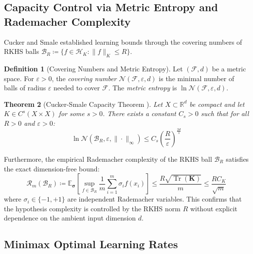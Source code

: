 \documentclass[11pt,a4paper]{article}
\newtheorem{theorem}{Theorem}[section]
\theoremstyle{definition}
\newtheorem{definition}[theorem]{Definition}
\begin{document}
\subsection{Capacity Control via Metric Entropy and Rademacher Complexity}

Cucker and Smale \cite{cucker2002} established learning bounds through the covering numbers of RKHS balls $\mathcal{B}_R \coloneqq \{ f \in \mathcal{H}_K : \|f\|_K \le R \}$.

\begin{definition}[Covering Numbers and Metric Entropy]\label{def:covering_numbers}
Let $(\mathcal{F}, d)$ be a metric space. For $\varepsilon > 0$, the \emph{covering number} $\mathcal{N}(\mathcal{F}, \varepsilon, d)$ is the minimal number of balls of radius $\varepsilon$ needed to cover $\mathcal{F}$. The \emph{metric entropy} is $\ln \mathcal{N}(\mathcal{F}, \varepsilon, d)$.
\end{definition}

\begin{theorem}[Cucker-Smale Capacity Theorem \cite{cucker2002}]\label{thm:cucker_smale_capacity}
Let $X \subset \mathbb{R}^d$ be compact and let $K \in C^s(X \times X)$ for some $s > 0$. There exists a constant $C_s > 0$ such that for all $R > 0$ and $\varepsilon > 0$:
\begin{equation}\label{eq:covering_bound}
\ln \mathcal{N}(\mathcal{B}_R, \varepsilon, \|\cdot\|_\infty) \le C_s \left( \frac{R}{\varepsilon} \right)^{\frac{2d}{s}}
\end{equation}
\end{theorem}

Furthermore, the empirical Rademacher complexity of the RKHS ball $\mathcal{B}_R$ satisfies the exact dimension-free bound:
\begin{equation}\label{eq:rademacher_bound}
\mathcal{R}_m(\mathcal{B}_R) \coloneqq \mathbb{E}_{\boldsymbol{\sigma}} \left[ \sup_{f \in \mathcal{B}_R} \frac{1}{m} \sum_{i=1}^m \sigma_i f(x_i) \right] \le \frac{R \sqrt{\operatorname{Tr}(\mathbf{K})}}{m} \le \frac{R C_K}{\sqrt{m}}
\end{equation}
where $\sigma_i \in \{-1, +1\}$ are independent Rademacher variables. This confirms that the hypothesis complexity is controlled by the RKHS norm $R$ without explicit dependence on the ambient input dimension $d$.

\subsection{Minimax Optimal Learning Rates}
\end{document}
